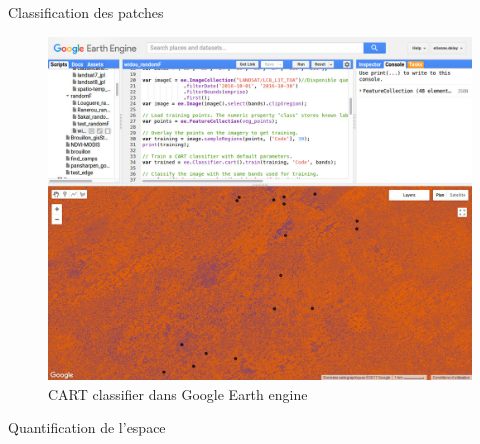 \documentclass[newPxFont]{beamer}
\begin{document}
\begin{frame}[c]{Classification des patches}
\vspace{-1cm}
\begin{figure}
  \includegraphics[width =\textwidth]{img/ggEarthEngine.jpg}
  \caption{CART classifier dans Google Earth engine}
\end{figure}
\end{frame}

\begin{frame}[c]{Quantification de l'espace}
\vspace{-1cm}
\begin{figure}
\end{figure}
\end{frame}
\end{document}

